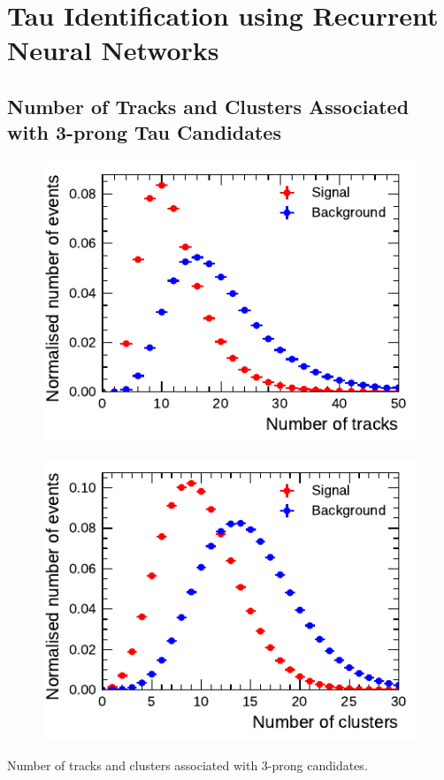 \clearpage
\section{Tau Identification using Recurrent Neural Networks}
\label{app:rnn}

\subsection{Number of Tracks and Clusters Associated with 3-prong Tau
  Candidates}

\noindent
\begin{minipage}{\textwidth}
  \captionsetup{type=figure}
  \begin{subfigure}[t]{0.48\textwidth}
    \centering
    \includegraphics{./figures/rnn/ntrk_3p.pdf}
  \end{subfigure}\hfill
  \begin{subfigure}[t]{0.48\textwidth}
    \centering
    \includegraphics{./figures/rnn/ncls_3p.pdf}
  \end{subfigure}
  \caption{Number of tracks and clusters associated with 3-prong \tauhadvis
    candidates.}
\end{minipage}

